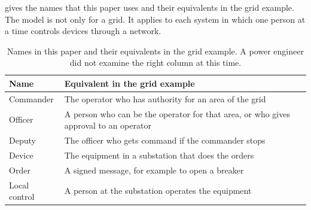  gives the names that this paper uses and their equivalents in the grid
example. The model is not only for a grid. It applies to each system in which one person at
a time controls devices through a network.

\begin{table}[t]
\caption{Names in this paper and their equivalents in the grid example. A power engineer
did not examine the right column at this time.}
\label{tab:names}
\centering
\small
\begin{tabularx}{\columnwidth}{@{}l>{\raggedright\arraybackslash}X@{}}
\toprule
Name & Equivalent in the grid example \\
\midrule
Commander & The operator who has authority for an area of the grid \\
Officer & A person who can be the operator for that area, or who gives approval to an operator \\
Deputy & The officer who gets command if the commander stops \\
Device & The equipment in a substation that does the orders \\
Order & A signed message, for example to open a breaker \\
Local control & A person at the substation operates the equipment \\
\bottomrule
\end{tabularx}
\end{table}
